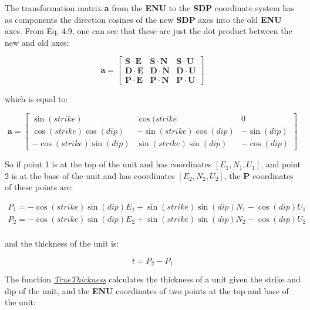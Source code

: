 \documentclass[a4paper , 12pt]{book}
\begin{document}
The transformation matrix \textbf{a} from the \textbf{ENU} to the \textbf{SDP} coordinate system has as components the direction cosines of the new \textbf{SDP} axes into the old \textbf{ENU} axes. From Eq. 4.9, one can see that these are just the dot product between the new and old axes:

\begin{equation*}
    \textbf{a}=
    \begin{bmatrix}
    \mathbf{S}\cdot\mathbf{E} & \mathbf{S}\cdot\mathbf{N} & \mathbf{S}\cdot\mathbf{U} \\
    \mathbf{D}\cdot\mathbf{E} & \mathbf{D}\cdot\mathbf{N} & \mathbf{D}\cdot\mathbf{U} \\
    \mathbf{P}\cdot\mathbf{E} & \mathbf{P}\cdot\mathbf{N} & \mathbf{P}\cdot\mathbf{U}
\end{bmatrix}
\end{equation*}

which is equal to:

\begin{equation}
    \textbf{a}=
    \begin{bmatrix}
    \sin(strike) & \cos(strike & 0 \\
    \cos(strike)\cos(dip) & -\sin(strike)\cos(dip) & -\sin(dip) \\
    -\cos(strike)\sin(dip) & \sin(strike)\sin(dip) & -\cos(dip)
\end{bmatrix}
\end{equation}

So if point 1 is at the top of the unit and has coordinates $[E_1,N_1,U_1]$, and point 2 is at the base of the unit and has coordinates $[E_2,N_2,U_2]$, the \textbf{P} coordinates of these points are:

\begin{equation}
    \begin{split}
        P_1 = -\cos(strike)\sin(dip)E_1+\sin(strike)\sin(dip)N_1-\cos(dip)U_1  \\
        P_2 = -\cos(strike)\sin(dip)E_2+\sin(strike)\sin(dip)N_2-\cos(dip)U_2  \\
    \end{split}
\end{equation}

and the thickness of the unit is:

\begin{equation}
    t = P_2-P_1
\end{equation}{}

The function \href{https://github.com/nfcd/compGeo/blob/master/source/functions/TrueThickness.py}{\textit{TrueThickness}} calculates the thickness of a unit given the strike and dip of the unit, and the \textbf{ENU} coordinates of two points at the top and base of the unit:
\end{document}
